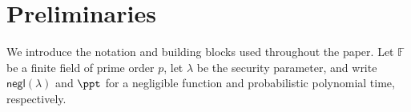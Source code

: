 \documentclass[conference,compsoc]{IEEEtran}
\newcommand{\protocol}{\textsf{LAMP}}   %
\theoremstyle{plain}
\theoremstyle{definition}
\theoremstyle{remark}
\begin{document}





\section{Preliminaries}
\label{sec:prelim}

We introduce the notation and building blocks used throughout the paper.  Let
$\mathbb{F}$ be a finite field of prime order $p$, let $\lambda$ be the
security parameter, and write $\textsf{negl}(\lambda)$ and $\ppt$ for a
negligible function and probabilistic polynomial time, respectively.
\end{document}
